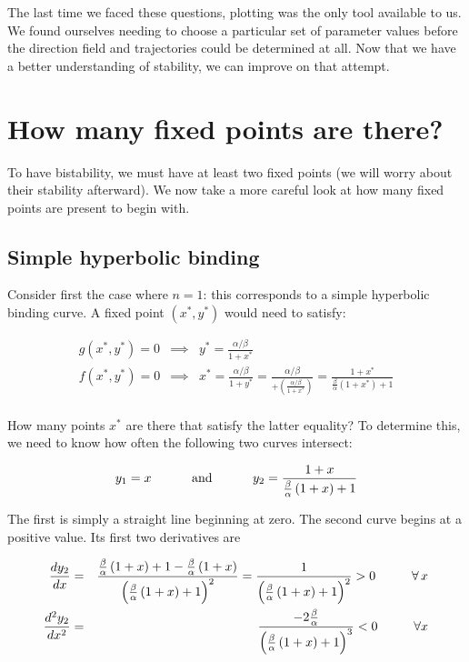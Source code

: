 \documentclass{article}
\begin{document}
The last time we faced these questions, plotting was the only tool available to us. We found ourselves needing to choose a particular set of parameter values before the direction field and trajectories could be determined at all. Now that we have a better understanding of stability, we can improve on that attempt.

\section*{How many fixed points are there?}

To have bistability, we must have at least two fixed points (we will worry about their stability afterward). We now take a more careful look at how many fixed points are present to begin with.

\subsection*{Simple hyperbolic binding}

Consider first the case where $n=1$: this corresponds to a simple hyperbolic binding curve. A fixed point $(x^*, y^*)$ would need to satisfy:

\begin{eqnarray*}
g(x^*, y^*) = 0 & \implies & y^* = \frac{\alpha/\beta}{1 + x^*}\\
f(x^*, y^*) = 0 & \implies & x^* = \frac{\alpha/\beta}{1 + y^*} = \frac{\alpha /\beta}{ + \left( \frac{\alpha/\beta}{1 + x^*} \right)} = \frac{1 + x^*}{\frac{\beta}{\alpha}\left(1 + x^*\right) + 1 }\\
\end{eqnarray*}

How many points $x^*$ are there that satisfy the latter equality? To determine this, we need to know how often the following two curves intersect:

\begin{eqnarray*}
y_1 = x  \hspace{1 cm} \textrm{ and } \hspace{1 cm}  y_2 = \frac{1 + x}{\frac{\beta}{\alpha}\left(1 + x\right) + 1 }
\end{eqnarray*}

The first is simply a straight line beginning at zero. The second curve begins at a positive value. Its first two derivatives are

\begin{eqnarray*}
\frac{dy_2}{dx} & = &\frac{\frac{\beta}{\alpha}\left(1 + x\right) + 1 - \frac{\beta}{\alpha} \left(1+x \right)}{\left( \frac{\beta}{\alpha}\left(1 + x\right) + 1 \right)^2} = \frac{1}{\left( \frac{\beta}{\alpha}\left(1 + x\right) + 1 \right)^2} > 0 \hspace{1 cm} \forall \, x\\
\frac{d^2y_2}{dx^2} & = & \frac{-2 \frac{\beta}{\alpha}}{\left( \frac{\beta}{\alpha}\left(1 + x\right) + 1 \right)^3}  < 0 \hspace{ 1 cm} \forall x
\end{eqnarray*}
\end{document}

